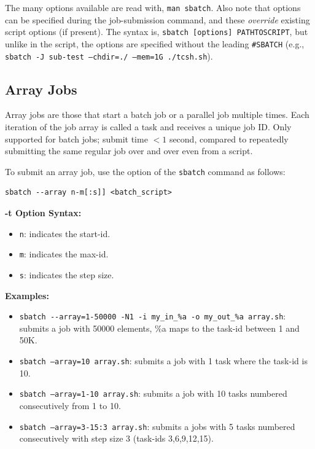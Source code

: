 The many  options available are read with, \texttt{man sbatch}. Also 
note that  options can be specified during the job-submission 
command, and these \emph{override} existing script options (if present). The 
syntax is, \texttt{sbatch [options] PATHTOSCRIPT}, but unlike in the script, 
the options are specified without the leading \verb+#SBATCH+
(e.g., \texttt{sbatch -J sub-test --chdir=./ --mem=1G ./tcsh.sh}).


\subsection{Array Jobs}
\label{sect:array-jobs}

Array jobs are those that start a batch job or a parallel job multiple times. 
Each iteration of the job array is called a task and receives a unique job ID.
Only supported for batch jobs; submit time $< 1$ second, compared to repeatedly
submitting the same regular job over and over even from a script.

To submit an array job, use the  option of the \texttt{sbatch} 
command as follows:

\begin{verbatim}
sbatch --array n-m[:s]] <batch_script>
\end{verbatim}

\textbf{-t Option Syntax:}
\begin{itemize}
\item
\texttt{n}: indicates the start-id.
\item
\texttt{m}: indicates the max-id.
\item
\texttt{s}: indicates the step size.
\end{itemize}

\textbf{Examples:}
\begin{itemize}
\item
\verb+sbatch --array=1-50000 -N1 -i my_in_%a -o my_out_%a array.sh+: submits a job with 50000 elements,
\%a maps to the task-id between 1 and 50K. 
\item
\texttt{sbatch --array=10 array.sh}: submits a job with 1 task where the task-id is 10. 
\item
\texttt{sbatch --array=1-10 array.sh}: submits a job with 10 tasks numbered consecutively from 1 to 10.
\item
\texttt{sbatch --array=3-15:3 array.sh}: submits a jobs with 5 tasks numbered consecutively with step size 3
(task-ids 3,6,9,12,15).
\end{itemize}

